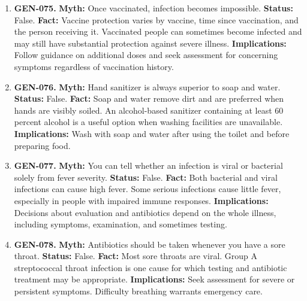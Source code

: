 \documentclass[11pt,oneside]{book}
\begin{document}
\begin{enumerate}[leftmargin=0pt,labelwidth=0pt,labelsep=0pt,itemindent=0pt]
\textbf{Implications:} Use the recommendations for the particular vaccine, age, and health condition when weighing benefits and risks.
\item[] \textbf{GEN-075.} \textbf{Myth:} Once vaccinated, infection becomes impossible.\newline
\textbf{Status:} False.\newline
\textbf{Fact:} Vaccine protection varies by vaccine, time since vaccination, and the person receiving it. Vaccinated people can sometimes become infected and may still have substantial protection against severe illness. \cite{ref314}\newline
\textbf{Implications:} Follow guidance on additional doses and seek assessment for concerning symptoms regardless of vaccination history.
\item[] \textbf{GEN-076.} \textbf{Myth:} Hand sanitizer is always superior to soap and water.\newline
\textbf{Status:} False.\newline
\textbf{Fact:} Soap and water remove dirt and are preferred when hands are visibly soiled. An alcohol-based sanitizer containing at least 60 percent alcohol is a useful option when washing facilities are unavailable. \cite{ref315}\newline
\textbf{Implications:} Wash with soap and water after using the toilet and before preparing food.
\item[] \textbf{GEN-077.} \textbf{Myth:} You can tell whether an infection is viral or bacterial solely from fever severity.\newline
\textbf{Status:} False.\newline
\textbf{Fact:} Both bacterial and viral infections can cause high fever. Some serious infections cause little fever, especially in people with impaired immune responses. \cite{ref295}\newline
\textbf{Implications:} Decisions about evaluation and antibiotics depend on the whole illness, including symptoms, examination, and sometimes testing.
\item[] \textbf{GEN-078.} \textbf{Myth:} Antibiotics should be taken whenever you have a sore throat.\newline
\textbf{Status:} False.\newline
\textbf{Fact:} Most sore throats are viral. Group A streptococcal throat infection is one cause for which testing and antibiotic treatment may be appropriate. \cite{ref316}\newline
\textbf{Implications:} Seek assessment for severe or persistent symptoms. Difficulty breathing warrants emergency care.

\end{enumerate}
\end{document}
